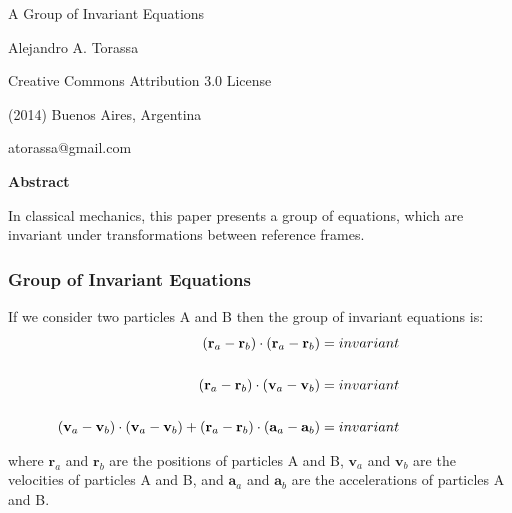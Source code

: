 \documentclass[10pt]{article}
\newcommand{\ra}{_a}
\newcommand{\rb}{_b}
\newcommand{\vR}{\mathbf{r}}
\newcommand{\vV}{\mathbf{v}}
\newcommand{\vA}{\mathbf{a}}
\begin{document}
\begin{center}

{\LARGE A Group of Invariant Equations}

\bigskip \medskip

Alejandro A. Torassa

\bigskip \medskip

\footnotesize

Creative Commons Attribution 3.0 License

(2014) Buenos Aires, Argentina

atorassa@gmail.com

\bigskip \smallskip

\small

{\bf Abstract}

\bigskip

\parbox{69mm}{In classical mechanics, this paper presents a group of equations, which are invariant under transformations between reference frames.}

\end{center}

\normalsize

\vspace{-0.30em}

{\centering\subsubsection*{Group of Invariant Equations}}

\vspace{+1.20em}

\par If we consider two particles A and B then the group of invariant equations is:
\vspace{+0.90em}
\begin{eqnarray*}
\hspace{-4.50em} (\vR\ra - \vR\rb) \cdot (\vR\ra - \vR\rb) = invariant \\ \\
\hspace{-4.50em} (\vR\ra - \vR\rb) \cdot (\vV\ra - \vV\rb) = invariant \\ \\
\hspace{-4.50em} (\vV\ra - \vV\rb) \cdot (\vV\ra - \vV\rb) + (\vR\ra - \vR\rb) \cdot (\vA\ra - \vA\rb) = invariant
\end{eqnarray*}
\vspace{+0.09em}
\par \noindent where $\vR\ra$ and $\vR\rb$ are the positions of particles A and B, $\vV\ra$ and $\vV\rb$ are the velocities of particles A and B, and $\vA\ra$ and $\vA\rb$ are the accelerations of particles A and B.
\end{document}
